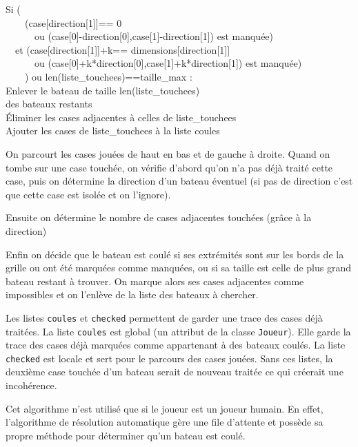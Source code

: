 \begin{algo1}
Si (\\
\ \ \ \ (case[direction[1]]== 0 \\
\ \ \ \ \ \ ou (case[0]-direction[0],case[1]-direction[1]) est manquée)\\
\ \ et (case[direction[1]]+k== dimensions[direction[1]] \\
\ \ \ \ \ \ ou (case[0]+k*direction[0],case[1]+k*direction[1]) est manquée)\\
\ \ \ \ ) ou len(liste\_touchees)==taille\_max :\\
Enlever le bateau de taille len(liste\_touchees)\\
des bateaux restants\\
Éliminer les cases adjacentes à celles de liste\_touchees\\
Ajouter les cases de liste\_touchees à la liste coules\\
\end{algo1}

On parcourt les cases jouées de haut en bas et de gauche à droite. Quand on tombe sur une case touchée, on vérifie d'abord qu'on n'a pas déjà traité cette case, puis on détermine la direction d'un bateau éventuel (si pas de direction c'est que cette case est isolée et on l'ignore). 

Ensuite on détermine le nombre de cases adjacentes touchées (grâce à la direction)

Enfin on décide que le bateau est coulé si ses extrémités sont sur les bords de la grille ou ont été marquées comme manquées, ou si sa taille est celle de plus grand bateau restant à trouver. On marque alors ses cases adjacentes comme impossibles et on l'enlève de la liste des bateaux à chercher.

Les listes \texttt{coules} et \texttt{checked} permettent de garder une trace des cases déjà traitées. La liste \texttt{coules} est global (un attribut de la classe \texttt{Joueur}). Elle garde la trace des cases déjà marquées comme appartenant à des bateaux coulés. La liste \texttt{checked} est locale et sert pour le parcours des cases jouées. Sans ces listes, la deuxième case touchée d'un bateau serait de nouveau traitée ce qui créerait une incohérence.

\medskip

Cet algorithme n'est utilisé que si le joueur est un joueur humain. En effet, l'algorithme de résolution automatique gère une file d'attente et possède sa propre méthode pour déterminer qu'un bateau est coulé. 




